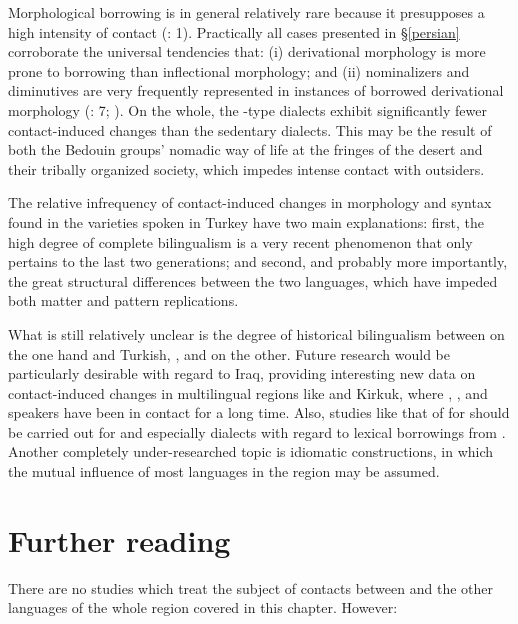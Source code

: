 \documentclass[output=paper]{langsci/langscibook}
\begin{document}
Morphological borrowing is in general relatively rare because it presupposes a high intensity of contact (\citealt{GardaniArkadievAmiridze2015}: 1). Practically all cases presented in §\ref{persian} corroborate the universal tendencies that: (i) {derivational} morphology is more prone to borrowing than {inflectional} morphology; and (ii) nominalizers and diminutives are very frequently represented in instances of borrowed {derivational} morphology (\citealt{GardaniArkadievAmiridze2015}: 7; \citealt{Seifart2013}). On the whole, the -type dialects exhibit significantly fewer contact-induced changes than the sedentary dialects. This may be the result of both the Bedouin groups' nomadic way of life at the fringes of the desert and their tribally organized society, which impedes intense contact with outsiders.

The {relative} infrequency of contact-induced changes in morphology and syntax found in the  varieties spoken in Turkey have two main explanations: first, the high degree of complete {bilingualism} is a very recent phenomenon that only pertains to the last two generations; and second, and probably more importantly, the great structural differences between the two languages, which have impeded both matter and pattern replications.

What is still relatively unclear is the degree of historical {bilingualism} between  on the one hand and  {Turkish}, , and  on the other. Future research would be particularly desirable with regard to Iraq, providing interesting new data on contact-induced changes in multilingual regions like  and Kirkuk, where , , and  speakers have been in contact for a long time. Also, studies like that of  \citet{Neishtadt2015} for  should be carried out for  and especially  dialects with regard to lexical borrowings from . Another completely under-researched topic is {idiomatic} constructions, in which the mutual influence of most languages in the region may be assumed.

\section*{Further reading}
There are no studies which treat the subject of contacts between  and the other languages of the whole region covered in this chapter. However:
\end{document}
